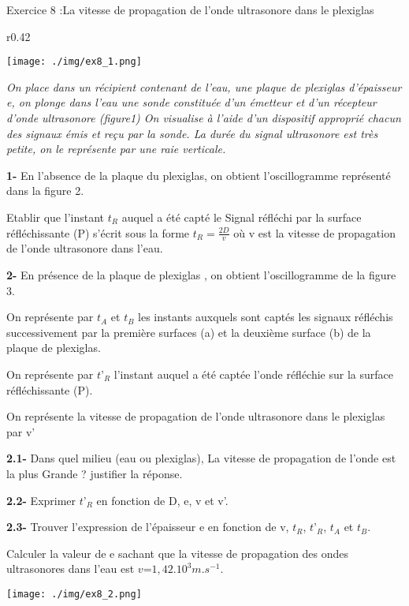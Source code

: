 \documentclass[12pt, french]{article}
\begin{document}
\begin{Box2}{Exercice 8 :La vitesse de propagation de l’onde ultrasonore dans le plexiglas }

	\begin{wrapfigure}[12]{r}{0.42\textwidth}
  \begin{center}
	  \vspace{-0.6cm}
	\texttt{[image: ./img/ex8\_1.png]}
  \end{center}
\end{wrapfigure}



	\emph{On place dans un récipient contenant de l’eau,
une plaque de plexiglas d’épaisseur e, on plonge
dans l’eau une sonde constituée d’un émetteur et
d’un récepteur d’onde ultrasonore (figure1) On
visualise à l’aide d’un dispositif approprié chacun
des signaux émis et reçu par la sonde. La durée du
signal ultrasonore est très petite, on le représente
par une raie verticale.
}

\textbf{1- }En l’absence de la plaque du plexiglas, on
obtient l’oscillogramme représenté dans la
figure 2.

Etablir que l’instant $t_R$ auquel a été capté le
Signal réfléchi par la surface réfléchissante (P) s’écrit sous la forme $t_R = \frac{2D}{v}$ 
où v est la vitesse de propagation de l’onde ultrasonore dans l’eau.

\textbf{2- }En présence de la plaque de plexiglas , on obtient l’oscillogramme de la figure 3.

On représente par $t_A$ et $t_B$ les instants auxquels sont captés les signaux réfléchis successivement
par la première surfaces (a) et la deuxième surface (b) de la plaque de plexiglas.

On représente par $t’_R$ l’instant auquel a été captée l’onde réfléchie sur la surface réfléchissante
(P).

On représente la vitesse de propagation de l’onde ultrasonore dans le plexiglas par v’

\textbf{2.1- }Dans quel milieu (eau ou plexiglas), La vitesse de propagation de l’onde est la plus Grande
? justifier la réponse.

\textbf{2.2- }Exprimer $t’_R$ en fonction de D, e, v et v’.

\textbf{2.3- }Trouver l’expression de l’épaisseur e en fonction de v, $t_R$, $t’_R$, $t_A$ et $t_B$.

Calculer la valeur de e sachant que la vitesse de propagation des ondes ultrasonores dans
l’eau est $v$=$1,42.10^3 m.s^{-1}$.

\begin{center}
	\texttt{[image: ./img/ex8\_2.png]}
  \end{center}

\end{Box2}
\end{document}
